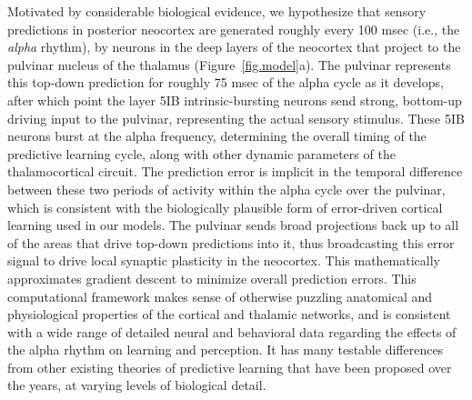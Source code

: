 \documentclass[12pt,twoside]{naturefigs}  %
\newif\myifpdf
\begin{document}
Motivated by considerable biological evidence\cite{OReillyWyatteRohrlich14}, we hypothesize that sensory predictions in posterior neocortex are generated roughly every 100 msec (i.e., the {\em alpha} rhythm), by neurons in the deep layers of the neocortex that project to the pulvinar nucleus of the thalamus (Figure~\ref{fig.model}a).  The pulvinar represents this top-down prediction for roughly 75 msec of the alpha cycle as it develops, after which point the layer 5IB intrinsic-bursting neurons send strong, bottom-up driving input to the pulvinar, representing the actual sensory stimulus\cite{ShermanGuillery06}.  These 5IB neurons burst at the alpha frequency, determining the overall timing of the predictive learning cycle, along with other dynamic parameters of the thalamocortical circuit\cite{LorinczKekesiJuhaszEtAl09,FranceschettiGuatteoPanzicaEtAl95,SaalmannPinskWangEtAl12}.  The prediction error is implicit in the temporal difference between these two periods of activity within the alpha cycle over the pulvinar, which is consistent with the biologically plausible form of error-driven cortical learning used in our models\cite{OReilly96}.  The pulvinar sends broad projections back up to all of the areas that drive top-down predictions into it\cite{Shipp03,Mumford91}, thus broadcasting this error signal to drive local synaptic plasticity in the neocortex. This mathematically approximates gradient descent to minimize overall prediction errors.  This computational framework makes sense of otherwise puzzling anatomical and physiological properties of the cortical and thalamic networks\cite{ShermanGuillery06}, and is consistent with a wide range of detailed neural and behavioral data regarding the effects of the alpha rhythm on learning and perception\cite{BuffaloFriesLandmanEtAl11,VanRullenKoch03,JensenBonnefondVanRullen12,FiebelkornKastner19}.  It has many testable differences from other existing theories of predictive learning that have been proposed over the years, at varying levels of biological detail\cite{Mumford92,RaoBallard99,KawatoHayakawaInui93,Friston05}.

\end{document}
